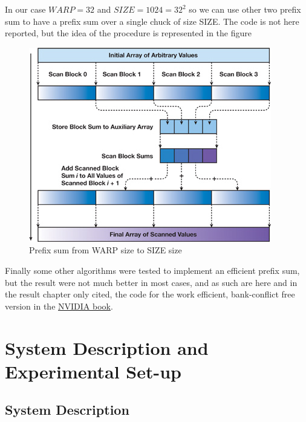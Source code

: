 \documentclass[conference]{IEEEtran}
\begin{document}
In our case $WARP=32$ and $SIZE=1024=32^2$ so we can use other two prefix sum to have a prefix sum over a single chuck of size SIZE. The code is not here reported, but the idea of the procedure is represented in the figure
\begin{figure}[h!]
	\centering
	\includegraphics[width=0.8\linewidth]{other_img/complete-prefix}
	\caption{Prefix sum from WARP size to SIZE size}
	\label{fig:complete-prefix}
\end{figure}

Finally some other algorithms were tested to implement an efficient prefix sum, but the result were not much better in most cases, and as such are here and in the result chapter only cited, the code for the work efficient, bank-conflict free version in the  \href{http://developer.nvidia.cn/gpugems/gpugems3/part-vi-gpu-computing/chapter-39-parallel-prefix-sum-scan-cuda}{NVIDIA book}.

\section{System Description and Experimental Set-up}

\subsection{System Description}
\end{document}
